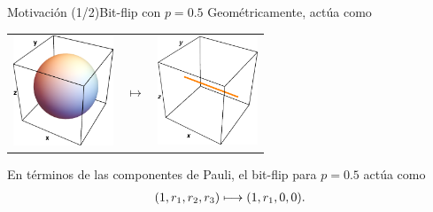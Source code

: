 \documentclass[xcolor=dvipsnames,presentation]{beamer}%
\begin{document}
\begin{frame}{Motivación (1/2)}{Bit-flip con $p=0.5$} \pause
	Geométricamente, actúa como 
	\begin{center}
	\begin{tabular}{m{2.5cm} m{1cm} m{2.5cm}}
		\includegraphics[width=3cm]{images/bloch-ball}
		& \hfill $\longmapsto$
		& \includegraphics[width=3cm]{images/bitFlip-toX}
	\end{tabular}
	\end{center}
	
	\vfill
	
	En términos de las componentes de Pauli, el bit-flip para $p=0.5$
	actúa como
	\begin{align*}
	\qty(1,r_1,r_2,r_3)\longmapsto \qty(1,r_1,0,0).
	\end{align*}
\end{frame}
\end{document}

